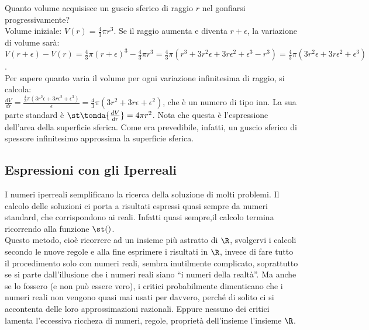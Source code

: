 \begin{esempio}
Quanto volume acquisisce un guscio sferico di raggio $r$ nel gonfiarsi
progressivamente?\\
Volume iniziale: $V(r)=\frac{4}{3}\pi r^3$. Se il raggio aumenta e diventa $r+\epsilon$, 
la variazione di volume sarà:\\
\(V(r+\epsilon)-V(r)=\frac{4}{3}\pi (r+\epsilon)^3-\frac{4}{3}\pi r^3=
\frac{4}{3}\pi (r^3+3r^2\epsilon+3r\epsilon^2+\epsilon^3-r^3)=
\frac{4}{3}\pi (3r^2\epsilon+3r\epsilon^2+\epsilon^3)\).\\
Per sapere quanto varia il volume per ogni variazione infinitesima di raggio, si calcola:\\
\(\frac{dV}{dr}=\frac{\frac{4}{3}\pi (3r^2\epsilon+3r\epsilon^2+\epsilon^3)}{\epsilon}=
\frac{4}{3}\pi (3r^2+3r\epsilon+\epsilon^2)\), che è un numero di tipo inn.
La sua parte standard è $\st\tonda{\frac{dV}{dr}}=4\pi r^2$. Nota che questa
è l'espressione dell'area della superficie sferica. Come era prevedibile, infatti, 
un guscio sferico di spessore infinitesimo approssima la superficie sferica.
\end{esempio}

\subsection{Espressioni con gli Iperreali}
\label{subsec:insnum_espressioni}

I numeri iperreali semplificano la ricerca della soluzione di molti problemi.
Il calcolo delle soluzioni ci porta a risultati espressi quasi sempre da numeri 
standard, che corrispondono ai reali. Infatti quasi sempre,il calcolo termina
ricorrendo alla funzione $\st()$.\\
Questo metodo, cioè ricorrere ad un insieme più astratto di \(\R\), svolgervi i calcoli
secondo le nuove regole e alla fine esprimere i risultati in \(\R\), invece di fare
tutto il procedimento solo con numeri reali, sembra inutilmente complicato, soprattutto
se si parte dall'illusione che i numeri reali siano ``i numeri della realtà''.
Ma anche se lo fossero (e non può essere vero), i critici probabilmente dimenticano 
che i numeri reali non vengono quasi mai usati per davvero, perché di solito ci si 
accontenta delle loro approssimazioni razionali. Eppure nessuno dei critici lamenta 
l'eccessiva riccheza di numeri, regole, proprietà dell'insieme l'insieme \(\R\).

